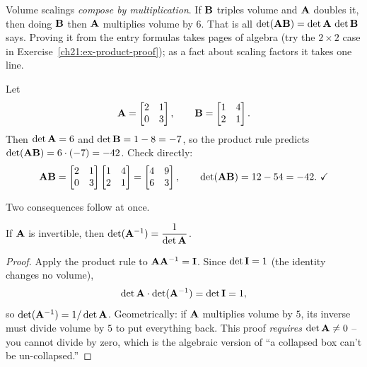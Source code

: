 \begin{intuitionbox}
Volume scalings \emph{compose by multiplication}. If $\mathbf{B}$ triples volume and
$\mathbf{A}$ doubles it, then doing $\mathbf{B}$ then $\mathbf{A}$ multiplies volume by
$6$. That is all $\det(\mathbf{A}\mathbf{B}) = \det\mathbf{A}\,\det\mathbf{B}$ says.
Proving it from the entry formulas takes pages of algebra (try the $2\times 2$ case
in Exercise~\ref{ch21:ex-product-proof}); as a fact about scaling factors it takes one line.
\end{intuitionbox}

\begin{example}
\label{ch21:ex-product}
Let
\[
  \mathbf{A} = \begin{bmatrix} 2 & 1 \\ 0 & 3 \end{bmatrix},\qquad
  \mathbf{B} = \begin{bmatrix} 1 & 4 \\ 2 & 1 \end{bmatrix}.
\]
Then $\det\mathbf{A} = 6$ and $\det\mathbf{B} = 1 - 8 = -7$, so the product rule
predicts $\det(\mathbf{A}\mathbf{B}) = 6\cdot(-7) = -42$. Check directly:
\[
  \mathbf{A}\mathbf{B}
  = \begin{bmatrix} 2 & 1 \\ 0 & 3 \end{bmatrix}\begin{bmatrix} 1 & 4 \\ 2 & 1 \end{bmatrix}
  = \begin{bmatrix} 4 & 9 \\ 6 & 3 \end{bmatrix},
  \qquad
  \det(\mathbf{A}\mathbf{B}) = 12 - 54 = -42.\ \checkmark
\]
\end{example}

Two consequences follow at once.

\begin{corollary}
\label{ch21:cor-inverse}
If $\mathbf{A}$ is invertible, then $\det(\mathbf{A}^{-1}) = \dfrac{1}{\det\mathbf{A}}$.
\end{corollary}

\begin{proof}
Apply the product rule to $\mathbf{A}\mathbf{A}^{-1} = \mathbf{I}$. Since $\det\mathbf{I} = 1$
(the identity changes no volume),
\[
  \det\mathbf{A}\cdot\det(\mathbf{A}^{-1}) = \det\mathbf{I} = 1,
\]
so $\det(\mathbf{A}^{-1}) = 1/\det\mathbf{A}$. Geometrically: if $\mathbf{A}$ multiplies
volume by $5$, its inverse must divide volume by $5$ to put everything back. This
proof \emph{requires} $\det\mathbf{A}\neq 0$ -- you cannot divide by
zero, which is the algebraic version of ``a collapsed box can't be un-collapsed.''
\end{proof}

